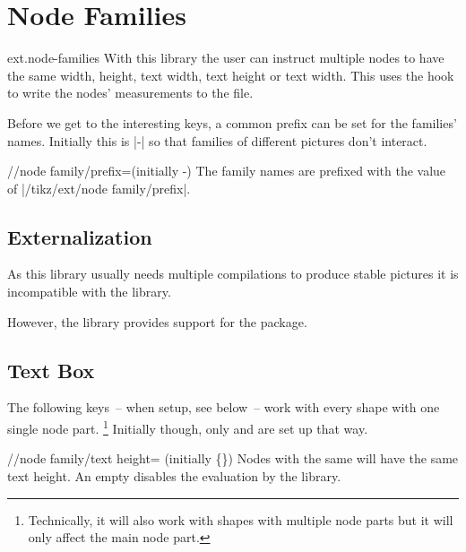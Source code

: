 %
%
%
\section{Node Families}
\begin{tikzlibrary}{ext.node-families}
  With this library the user can instruct multiple nodes to have the same
  width, height, text width, text height or text width.
  This uses the hook  to write the nodes'
  measurements to the  file.
  
\end{tikzlibrary}

Before we get to the interesting keys, a common prefix can be set for the families' names.
Initially this is |\pgfpictureid-| so that families of different pictures don't interact.
\begin{key}{/\tikzext/node family/prefix=(initially \string\pgfpictureid-)}
The family names are prefixed with the value of |/tikz/ext/node family/prefix|.
\end{key}

\subsection{Externalization}
As this library usually needs multiple compilations
to produce stable pictures it is incompatible
with the  library.

However, the library provides support for the
 \cite{memoize} package.
\subsection{Text Box}
\label{ssec:nf-text}
The following keys~-- when setup, see below~-- work with every shape with one single node part.%
\footnote{Technically, it will also work with shapes with multiple node parts but it will only affect the main node part.}
Initially though, only  and  are set up that way.
\begin{key}{/\tikzext/node family/text height= (initially \{\})}
Nodes with the same  will have the same text height.
An empty  disables the evaluation by the library.
\end{key}

